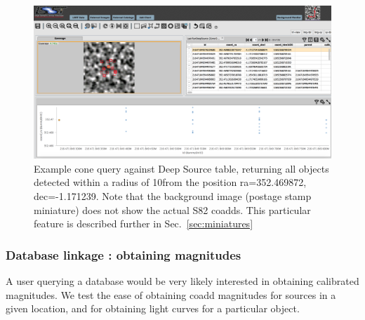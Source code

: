 \documentclass[DM,lsstdraft,toc]{lsstdoc}
\begin{document}
\begin{figure}
\includegraphics[width=\textwidth]{figs/3_PDAC_cone_DeepSource}
\caption{Example cone query against Deep Source table, returning all objects detected within a radius of 10\arcsec from the position ra=352.469872\degree , dec=-1.171239\degree. Note that the background image (postage stamp miniature) does not show the actual S82 coadds. This particular feature is described further in Sec.~\ref{sec:miniatures}}
\label{fig:PDAC_cone_DS}
\end{figure}



\subsubsection{Database linkage : obtaining magnitudes}
\label{sec:linkage_magnitudes}

A user querying a database would be very likely interested in obtaining calibrated magnitudes. We test the ease of obtaining coadd magnitudes  for sources in a given location,  and for obtaining light curves for a particular object.
\end{document}
